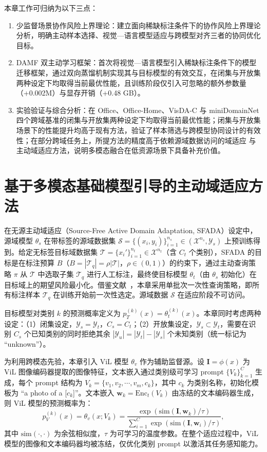 本章工作可归纳为以下三点：
\begin{enumerate}
    \item 少监督场景协作风险上界理论：建立面向稀缺标注条件下的协作风险上界理论分析，明确主动样本选择、视觉—语言模型适应与跨模型对齐三者的协同优化目标。
    \item DAMF 双主动学习框架：首次将视觉—语言模型引入稀缺标注条件下的模型迁移框架，通过双向蒸馏机制实现其与目标模型的有效交互，在闭集与开放集两种设定下均取得当前最优性能，且训练阶段仅引入可忽略的额外参数量（+0.002M）与显存开销（+0.48 GB）。
    \item 实验验证与综合分析：在 Office、Office-Home、VisDA-C 与 miniDomainNet 四个跨域基准的闭集与开放集两种设定下均取得当前最优性能；闭集与开放集场景下的性能提升均高于现有方法，验证了样本筛选与跨模型协同设计的有效性；在部分跨域任务上，所提方法的精度高于依赖源域数据访问的域适应 与主动域适应方法，说明多模态融合在低资源场景下具备补充价值。
\end{enumerate}

\section{基于多模态基础模型引导的主动域适应方法}

\label{sec:chap3_damf}

在无源主动域适应（Source-Free Active Domain Adaptation, SFADA）设定中，源域模型 $\theta_s$ 在带标签的源域数据集 $\mathcal{S}=\{(x_i,y_i)\}_{i=1}^{n_s}\in(\mathcal{X}^{n_s},\mathcal{Y}_s)$ 上预训练得到。给定无标签目标域数据集 $\mathcal{T}=\{x_i'\}_{i=1}^{n_t}\in\mathcal{X}^{n_t}$（含 $C_t$ 个类别），SFADA 的目标是在标注预算 $B$（$B=|\mathcal{T}_q|=\rho|\mathcal{T}|$，$\rho\in(0,1)$）的约束下，通过主动查询策略 $\pi$ 从 $\mathcal{T}$ 中选取子集 $\mathcal{T}_q$ 进行人工标注，最终使目标模型 $\theta_t$（由 $\theta_s$ 初始化）在目标域上的期望风险最小化。借鉴文献~\cite{wang2023mhpl,chu2022denoised}，本章采用单批次一次性查询策略，即所有标注样本 $\mathcal{T}_q$ 在训练开始前一次性选定。源域数据 $\mathcal{S}$ 在适应阶段不可访问。

目标模型对类别 $k$ 的预测概率定义为 $p_T^{(k)}(x)=\theta_t^{(k)}(x)$。本章同时考虑两种设定：（1）闭集设定，$\mathcal{Y}_s=\mathcal{Y}_t$，$C_s=C_t$；（2）开放集设定，$\mathcal{Y}_s\subset\mathcal{Y}_t$，需要在识别 $C_s$ 个已知类别的同时拒绝其余 $|\mathcal{Y}_u|=|\mathcal{Y}_t|-|\mathcal{Y}_s|$ 个未知类别（统一标记为 ``unknown''）。

为利用跨模态先验，本章引入 ViL 模型 $\theta_v$ 作为辅助监督源。设 $\mathbf{I}=\phi(x)$ 为 ViL 图像编码器提取的图像特征，文本嵌入通过类别级可学习 prompt $\{V_k\}_{k=1}^{C}$ 生成，每个 prompt 结构为 $V_k=\{v_1,v_2,\cdots,v_m,c_k\}$，其中 $c_k$ 为类别名称，初始化模板为 ``a photo of a [$c_k$]''。文本嵌入 $\mathbf{w}_k=\mathrm{Enc}_t(V_k)$ 由冻结的文本编码器生成，则 ViL 模型的预测概率为：
\begin{equation}
p_V^{(k)}(x) = \theta_v(x; V_k) = \frac{\exp(\mathrm{sim}(\mathbf{I}, \mathbf{w}_k)/\tau)}{\sum_{i=1}^{C}\exp(\mathrm{sim}(\mathbf{I}, \mathbf{w}_i)/\tau)},
\label{eq:vil_pred}
\end{equation}
其中 $\mathrm{sim}(\cdot,\cdot)$ 为余弦相似度，$\tau$ 为可学习的温度参数。在整个适应过程中，ViL 模型的图像和文本编码器均被冻结，仅优化类别 prompt 以激活其任务感知能力。

